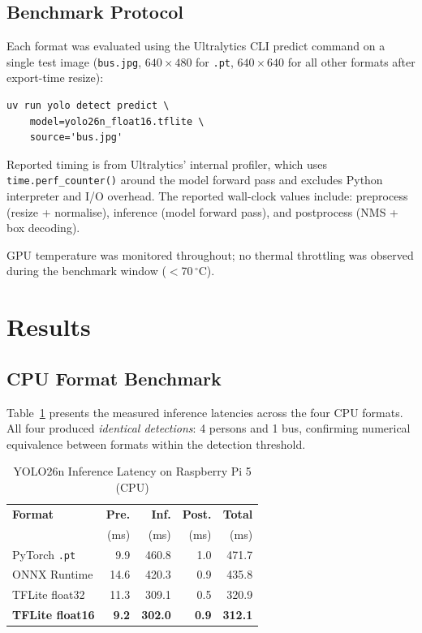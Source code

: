 \documentclass[conference]{IEEEtran}
\begin{document}
\subsection{Benchmark Protocol}

Each format was evaluated using the Ultralytics CLI predict command on a
single test image (\texttt{bus.jpg}, $640\times480$ for \texttt{.pt},
$640\times640$ for all other formats after export-time resize):

\begin{lstlisting}[caption={Example benchmark invocation}]
uv run yolo detect predict \
    model=yolo26n_float16.tflite \
    source='bus.jpg'
\end{lstlisting}

Reported timing is from Ultralytics' internal profiler, which uses
\texttt{time.perf\_counter()} around the model forward pass and excludes
Python interpreter and I/O overhead. The reported wall-clock values include:
preprocess (resize + normalise), inference (model forward pass), and
postprocess (NMS + box decoding).

GPU temperature was monitored throughout; no thermal throttling was
observed during the benchmark window ($<$70\,$^\circ$C).

\section{Results}

\subsection{CPU Format Benchmark}

Table~\ref{tab:benchmark} presents the measured inference latencies across the
four CPU formats. All four produced \emph{identical detections}: 4 persons and
1 bus, confirming numerical equivalence between formats within the detection
threshold.

\begin{table}[ht]
  \caption{YOLO26n Inference Latency on Raspberry Pi 5 (CPU)}
  \label{tab:benchmark}
  \centering
  \begin{tabular}{lrrrr}
    \toprule
    \textbf{Format} & \textbf{Pre.} & \textbf{Inf.} & \textbf{Post.} & \textbf{Total} \\
                    & (ms) & (ms) & (ms) & (ms) \\
    \midrule
    PyTorch \texttt{.pt}     & 9.9  & 460.8 & 1.0 & 471.7 \\
    ONNX Runtime             & 14.6 & 420.3 & 0.9 & 435.8 \\
    TFLite float32           & 11.3 & 309.1 & 0.5 & 320.9 \\
    \textbf{TFLite float16}  & \textbf{9.2} & \textbf{302.0} & \textbf{0.9} & \textbf{312.1} \\
    \bottomrule
  \end{tabular}
\end{table}
\end{document}
